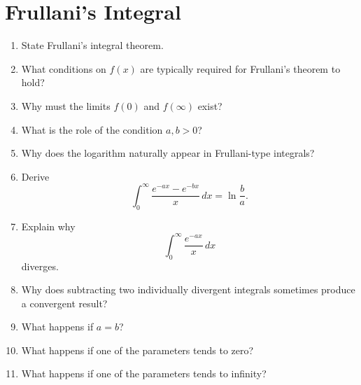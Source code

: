 \section{Frullani's Integral}

\begin{enumerate}


  \item State Frullani's integral theorem.
  \item What conditions on $f(x)$ are typically required for Frullani's theorem to hold?
  \item Why must the limits $f(0)$ and $f(\infty)$ exist?
  \item What is the role of the condition $a,b>0$?
  \item Why does the logarithm naturally appear in Frullani-type integrals?
  \item Derive
    \[
      \int_0^\infty \frac{e^{-ax} - e^{-bx}}{x}\,dx = \ln\frac{b}{a}.
    \]
  \item Explain why
    \[
      \int_0^\infty \frac{e^{-ax}}{x}\,dx
    \]
    diverges.
  \item Why does subtracting two individually divergent integrals sometimes produce a convergent result?


  \item What happens if $a = b$?
  \item What happens if one of the parameters tends to zero?
  \item What happens if one of the parameters tends to infinity?



\end{enumerate}
